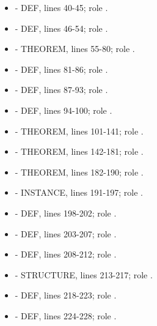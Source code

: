 \begin{itemize}
\tightlist
\item
  \texttt{\protect{}} - DEF, lines 40-45; role \texttt{\protect{}}.
\item
  \texttt{\protect{}} - DEF, lines 46-54; role \texttt{\protect{}}.
\item
  \texttt{\protect{}} - THEOREM, lines 55-80; role
  \texttt{\protect{}}.
\item
  \texttt{\protect{}} - DEF, lines 81-86; role
  \texttt{\protect{}}.
\item
  \texttt{\protect{}} - DEF, lines 87-93; role \texttt{\protect{}}.
\item
  \texttt{\protect{}} - DEF, lines 94-100; role \texttt{\protect{}}.
\item
  \texttt{\protect{}} - THEOREM, lines 101-141; role
  \texttt{\protect{}}.
\item
  \texttt{\protect{}} - THEOREM, lines 142-181; role
  \texttt{\protect{}}.
\item
  \texttt{\protect{}} - THEOREM, lines 182-190; role
  \texttt{\protect{}}.
\item
  \texttt{\protect{}} - INSTANCE, lines 191-197; role
  \texttt{\protect{}}.
\item
  \texttt{\protect{}} - DEF, lines 198-202; role \texttt{\protect{}}.
\item
  \texttt{\protect{}} - DEF, lines 203-207; role \texttt{\protect{}}.
\item
  \texttt{\protect{}} - DEF, lines 208-212; role \texttt{\protect{}}.
\item
  \texttt{\protect{}} - STRUCTURE, lines 213-217; role
  \texttt{\protect{}}.
\item
  \texttt{\protect{}} - DEF, lines 218-223; role \texttt{\protect{}}.
\item
  \texttt{\protect{}} - DEF, lines 224-228; role \texttt{\protect{}}.

\end{itemize}
